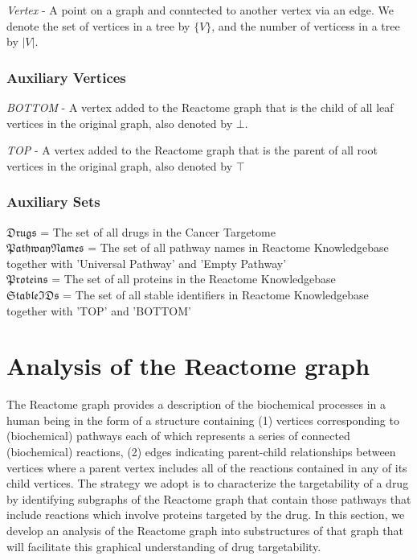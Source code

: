 \documentclass{article}
\begin{document}
\noindent\textit{Vertex} - A point on a graph and conntected to another vertex via an edge. We denote the set of vertices in a tree by $\{V\}$, and the number of verticess in a tree by $|V|$.

\subsubsection{Auxiliary Vertices}

\noindent\textit{BOTTOM} - A vertex added to the Reactome graph that is the child of all leaf vertices in the original graph, also denoted by $\bot$.

\noindent\textit{TOP} - A vertex added to the Reactome graph that is the parent of all root vertices in the original graph, also denoted by $\top$

\subsubsection{Auxiliary Sets}

\noindent$\mathfrak{Drugs}$ = The set of all drugs in the Cancer Targetome \\
\noindent$\mathfrak{PathwayNames}$ = The set of all pathway names in Reactome Knowledgebase together with 'Universal Pathway' and 'Empty Pathway' \\
\noindent$\mathfrak{Proteins}$ = The set of all proteins in the Reactome Knowledgebase \\
\noindent$\mathfrak{StableIDs}$ = The set of all stable identifiers in Reactome Knowledgebase together with 'TOP' and 'BOTTOM' \\

\section{Analysis of the Reactome graph}

The Reactome graph provides a description of the biochemical processes in a human being in the form of a structure containing (1) vertices corresponding to (biochemical) pathways each of which represents a series of connected (biochemical) reactions, (2) edges indicating parent-child relationships between vertices where a parent vertex includes all of the reactions contained in any of its child vertices. The strategy we adopt is to characterize the targetability of a drug by identifying subgraphs of the Reactome graph that contain those pathways that include reactions which involve proteins targeted by the drug. In this section, we develop an analysis of the Reactome graph into substructures of that graph that will facilitate this graphical understanding of drug targetability.
\end{document}
